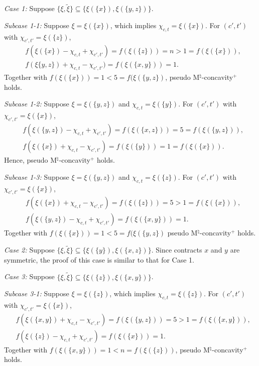 \documentclass[12pt]{amsart}
\theoremstyle{remark}
\begin{document}
\smallskip
\noindent
\emph{Case 1:}
Suppose $\{\xi, \tilde \xi\}\subseteq \{\xi(\{x\}), \xi(\{y,z\})\}$.

\smallskip
\noindent
\emph{Subcase 1-1:}
Suppose $\xi=\xi(\{x\})$, which implies $\chi_{c,t}=\xi(\{x\})$. For $(c',t')$ with $\chi_{c',t'}=\xi(\{z\})$,
\begin{align*}
&f(\xi(\{x\})-\chi_{c,t}+\chi_{c',t'})=f(\xi(\{z\}))=n>1=f(\xi(\{x\})), \\
&f(\xi\{y,z\})+\chi_{c,t}-\chi_{c',t'})=f(\xi(\{x,y\}))=1.
\end{align*}
Together with $f(\xi(\{x\}))=1<5=f(\xi(\{y,z\})$, pseudo M$^\natural$-concavity$^+$ holds.

\smallskip
\noindent
\emph{Subcase 1-2:}
Suppose $\xi=\xi(\{y,z\})$ and $\chi_{c,t}=\xi(\{y\})$. For $(c',t')$ with $\chi_{c',t'}=\xi(\{x\})$,
\begin{align*}
&f(\xi(\{y,z\})-\chi_{c,t}+\chi_{c',t'})=f(\xi(\{x,z\}))=5=f(\xi(\{y,z\})),   \\
&f(\xi(\{x\})+\chi_{c,t}-\chi_{c',t'})=f(\xi(\{y\}))=1=f(\xi(\{x\})).
\end{align*}
Hence, pseudo M$^\natural$-concavity$^+$ holds.


\smallskip
\noindent
\emph{Subcase 1-3:}
Suppose $\xi=\xi(\{y,z\})$ and $\chi_{c,t}=\xi(\{z\})$. For $(c',t')$ with $\chi_{c',t'}=\xi(\{x\})$,
\begin{align*}
&f(\xi(\{x\})+\chi_{c,t}-\chi_{c',t'})=f(\xi(\{z\}))=5>1=f(\xi(\{x\})), \\
&f(\xi(\{y,z\})-\chi_{c,t}+\chi_{c',t'})=f(\xi(\{x,y\}))=1.
\end{align*}
Together with $f(\xi(\{x\}))=1<5=f(\xi(\{y,z\})$ pseudo M$^\natural$-concavity$^+$ holds.

\smallskip
\noindent
\emph{Case 2:}
Suppose $\{\xi, \tilde \xi\}\subseteq  \{\xi(\{y\}), \xi(\{x,z\})\}$. Since contracts $x$ and $y$ are symmetric, the proof of this case is similar to that for Case 1.

\smallskip
\noindent
\emph{Case 3:}
Suppose $\{\xi, \tilde \xi\}\subseteq \{\xi(\{z\}), \xi(\{x,y\})\}$.

\smallskip
\noindent
\emph{Subcase 3-1:}
Suppose $\xi=\xi(\{z\})$, which implies $\chi_{c,t}=\xi(\{z\})$. For $(c',t')$ with $\chi_{c',t'}=\xi(\{x\})$,
\begin{align*}
&f(\xi(\{x,y\})+\chi_{c,t}-\chi_{c',t'})=f(\xi(\{y,z\}))=5>1=f(\xi(\{x,y\})), \\
&f(\xi(\{z\})-\chi_{c,t}+\chi_{c',t'})=f(\xi(\{x\}))=1.
\end{align*}
Together with $f(\xi(\{x,y\}))=1<n=f(\xi(\{z\}))$, pseudo M$^\natural$-concavity$^+$ holds.
\end{document}
